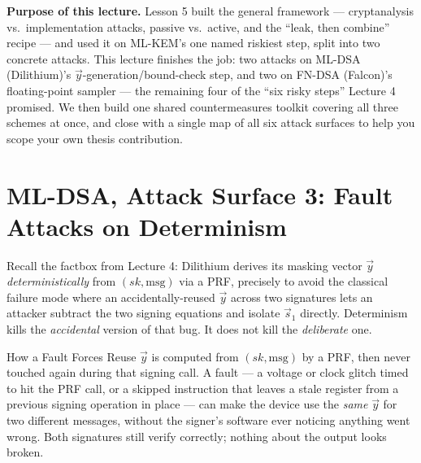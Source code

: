 \begin{notebox}
\small\textbf{Purpose of this lecture.} Lesson 5 built the general framework --- cryptanalysis vs.\ implementation attacks, passive vs.\ active, and the ``leak, then combine'' recipe --- and used it on ML-KEM's one named riskiest step, split into two concrete attacks. This lecture finishes the job: two attacks on ML-DSA (Dilithium)'s $\vec y$-generation/bound-check step, and two on FN-DSA (Falcon)'s floating-point sampler --- the remaining four of the ``six risky steps'' Lecture 4 promised. We then build one shared countermeasures toolkit covering all three schemes at once, and close with a single map of all six attack surfaces to help you scope your own thesis contribution.
\end{notebox}

\section{ML-DSA, Attack Surface 3: Fault Attacks on Determinism}
\label{sec:L6:fault-attacks-on-determinism}

Recall the factbox from Lecture 4: Dilithium derives its masking vector $\vec y$ \emph{deterministically} from $(sk,\text{msg})$ via a PRF, precisely to avoid the classical failure mode where an accidentally-reused $\vec y$ across two signatures lets an attacker subtract the two signing equations and isolate $\vec s_1$ directly. Determinism kills the \emph{accidental} version of that bug. It does not kill the \emph{deliberate} one.

\begin{rmkbox}{How a Fault Forces Reuse}
$\vec y$ is computed from $(sk,\text{msg})$ by a PRF, then never touched again during that signing call. A fault --- a voltage or clock glitch timed to hit the PRF call, or a skipped instruction that leaves a stale register from a previous signing operation in place --- can make the device use the \emph{same} $\vec y$ for two different messages, without the signer's software ever noticing anything went wrong. Both signatures still verify correctly; nothing about the output looks broken.
\end{rmkbox}

